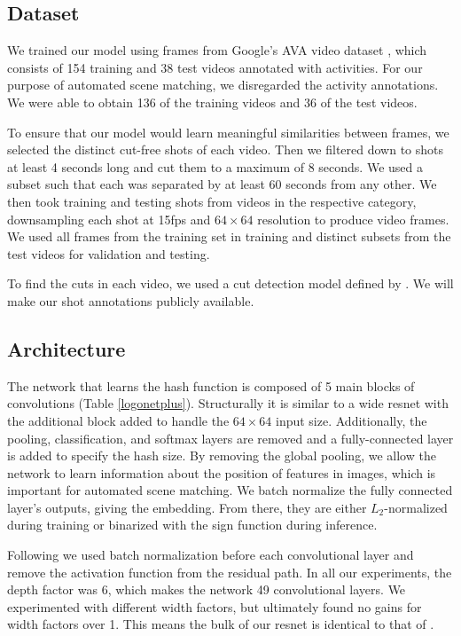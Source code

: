 \documentclass{article}
\begin{document}
\begin{multicols}{2}
\subsection{Dataset}

We trained our model using frames from Google's AVA video dataset \cite{ava17}, which consists of 154 training and 38 test videos annotated with activities.
For our purpose of automated scene matching, we disregarded the activity annotations.
We were able to obtain 136 of the training videos and 36 of the test videos.

To ensure that our model would learn meaningful similarities between frames, we selected the distinct cut-free shots of each video.
Then we filtered down to shots at least 4 seconds long and cut them to a maximum of 8 seconds.
We used a subset such that each was separated by at least 60 seconds from any other.
We then took training and testing shots from videos in the respective category, downsampling each shot at 15fps and $64\times64$ resolution to produce video frames.
We used all frames from the training set in training and distinct subsets from the test videos for validation and testing.

To find the cuts in each video, we used a cut detection model defined by \cite{Gygli17}.
We will make our shot annotations publicly available.


\subsection{Architecture}

The network that learns the hash function is composed of 5 main blocks of convolutions (Table \ref{logonetplus}). 
Structurally it is similar to a wide resnet \cite{wideResnet} with the additional block added to handle the $64\times64$ input size.
Additionally, the pooling, classification, and softmax layers are removed and a fully-connected layer is added to specify the hash size.
By removing the global pooling, we allow the network to learn information about the position of features in images, which is important for automated scene matching.
We batch normalize the fully connected layer's outputs, giving the embedding.
From there, they are either $L_2$-normalized during training or binarized with the sign function during inference.

Following \cite{He2016IdentityMI} we used batch normalization before each convolutional layer and remove the activation function from the residual path.
In all our experiments, the depth factor was 6, which makes the network 49 convolutional layers.
We experimented with different width factors, but ultimately found no gains for width factors over 1.
This means the bulk of our resnet is identical to that of \cite{He2016DeepRL}.



\end{multicols}
\end{document}
